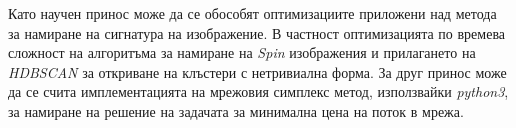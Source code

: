 \documentclass[a4paper,12pt]{article}
\begin{document}
\bigbreak

Като научен принос може да се обособят оптимизациите приложени над метода за намиране на сигнатура на изображение. В частност оптимизацията по времева сложност на алгоритъма за намиране на \textit{Spin} изображения и прилагането на \textit{HDBSCAN} за откриване на клъстери с нетривиална форма. За друг принос може да се счита имплементацията на мрежовия симплекс метод, използвайки \textit{python3}, за намиране на решение на задачата за минимална цена на поток в мрежа.

\printbibliography[title={Използвана литература}]
\end{document}
